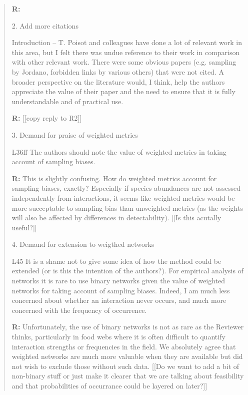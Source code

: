 \documentclass[12pt]{letter}
\newenvironment{refquote}{\bigskip \begin{it}}{\end{it}\smallskip}
\begin{document}
\begin{quotation}
	\textbf{R:}

	2. Add more citations

	\begin{refquote}
	Introduction – T. Poisot and colleagues have done a lot of relevant work in this area, but I felt there was undue reference to their work in comparison with other relevant work. There were some obvious papers (e.g. sampling by Jordano, forbidden links by various others) that were not cited. A broader perspective on the literature would, I think, help the authors appreciate the value of their paper and the need to ensure that it is fully understandable and of practical use.
	\end{refquote}

	\textbf{R:} [[copy reply to R2]]

	3. Demand for praise of weighted metrics

	\begin{refquote}
	L36ff The authors should note the value of weighted metrics in taking account of sampling biases.
	\end{refquote}

	\textbf{R:} This is slightly confusing. How do weighted metrics account for sampling biases, exactly? Especially if species abundances are not assessed independently from interactions, it seems like weighted metrics would be more succeptable to sampling bias than unweighted metrics (as the weights will also be affected by differences in detectability). [[Is this acutally useful?]]

	4. Demand for extension to weigthed networks

	\begin{refquote}
	L45 It is a shame not to give some idea of how the method could be extended (or is this the intention of the authors?). For empirical analysis of networks it is rare to use binary networks given the value of weighted networks for taking account of sampling biases. Indeed, I am much less concerned about whether an interaction never occurs, and much more concerned with the frequency of occurrence.
	\end{refquote}

	\textbf{R:} Unfortunately, the use of binary networks is not as rare as the Reviewer thinks, particularly in food webs where it is often difficult to quantify interaction strengths or frequencies in the field. We absolutely agree that weighted networks are much more valuable when they are available but did not wish to exclude those without such data. [[Do we want to add a bit of non-binary stuff or just make it clearer that we are talking about feasibility and that probabilities of occurrance could be layered on later?]]


\end{quotation}
\end{document}
